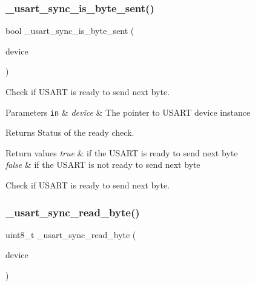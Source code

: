 \subsubsection{\texorpdfstring{\+\_\+usart\+\_\+sync\+\_\+is\+\_\+byte\+\_\+sent()}{\_usart\_sync\_is\_byte\_sent()}}
{\footnotesize\ttfamily bool \+\_\+usart\+\_\+sync\+\_\+is\+\_\+byte\+\_\+sent (\begin{DoxyParamCaption}\item[{const struct \hyperlink{struct__usart__sync__device}{\+\_\+usart\+\_\+sync\+\_\+device} $\ast$const}]{device }\end{DoxyParamCaption})}



Check if U\+S\+A\+RT is ready to send next byte. 


\begin{DoxyParams}[1]{Parameters}
\mbox{\tt in}  & {\em device} & The pointer to U\+S\+A\+RT device instance\\
\hline
\end{DoxyParams}
\begin{DoxyReturn}{Returns}
Status of the ready check. 
\end{DoxyReturn}

\begin{DoxyRetVals}{Return values}
{\em true} & if the U\+S\+A\+RT is ready to send next byte \\
\hline
{\em false} & if the U\+S\+A\+RT is not ready to send next byte\\
\hline
\end{DoxyRetVals}
Check if U\+S\+A\+RT is ready to send next byte. \mbox{\label{group___h_p_l_gad6e42aaa92499103016d605362e35d97}} 
\subsubsection{\texorpdfstring{\+\_\+usart\+\_\+sync\+\_\+read\+\_\+byte()}{\_usart\_sync\_read\_byte()}}
{\footnotesize\ttfamily uint8\+\_\+t \+\_\+usart\+\_\+sync\+\_\+read\+\_\+byte (\begin{DoxyParamCaption}\item[{const struct \hyperlink{struct__usart__sync__device}{\+\_\+usart\+\_\+sync\+\_\+device} $\ast$const}]{device }\end{DoxyParamCaption})}



